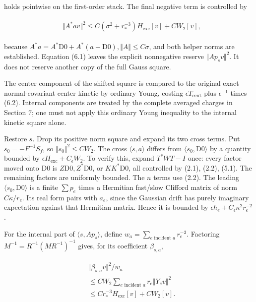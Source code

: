 holds pointwise on the first-order stack. The final negative term is
controlled by

\begin{gather*}
\begin{aligned}
& \Vert A^{*}a v\Vert ^{2}\le C( \sigma ^{2}+r_{*}^{-3})H_{\mathrm{exc}}[v]+CW_{2}[v],
\end{aligned}\tag{6.2}
\end{gather*}

because
\(A^{*}a=A^{*}\mathrm{D0}+A^{*}(a-\mathrm{D0}), \Vert A\Vert \le C \sigma\),
and both helper norms are established. Equation (6.1) leaves the
explicit nonnegative reserve \(\Vert A p_{s} v\Vert ^{2}\). It does not
reserve another copy of the full Gauss square.

The center component of the shifted square is compared to the original
exact normal-covariant center kinetic by ordinary Young, costing
\(\epsilon  T_{\mathrm{cent}}\) plus \(\epsilon ^{-1}\) times (6.2).
Internal components are treated by the complete averaged charges in
Section \(7\); one must not apply this ordinary Young inequality to the
internal kinetic square alone.

Restore \(s\). Drop its positive norm square and expand its two cross
terms. Put \(s_{0}=-F^{-1}S_{f}\), so
\(\Vert s_{0}\Vert ^{2}\le CW_{2}\). The cross \(\langle s,a\rangle\)
differs from \(\langle s_{0},\mathrm{D0}\rangle\) by a quantity bounded
by \(\epsilon  H_{\mathrm{exc}}+C_{\epsilon} W_{2}\). To verify this,
expand \(T^{*}WT-I\) once: every factor moved onto \(\mathrm{D0}\) is
\(Z\mathrm{D0}, Z^{*}\mathrm{D0}\), or \(KK^{*}\mathrm{D0}\), all
controlled by (2.1), (2.2), (5.1). The remaining factors are uniformly
bounded. The \(n\) terms use (2.2). The leading
\(\langle s_{0},\mathrm{D0}\rangle\) is a finite \(\sum  p_{e}\) times a
Hermitian fast/slow Clifford matrix of norm \(C \kappa  /r_{e}\). Its
real form pairs with \(a_{e}\), since the Gaussian drift has purely
imaginary expectation against that Hermitian matrix. Hence it is bounded
by \(\epsilon  h_{e}+C_{\epsilon} \kappa ^{2}r_{e}^{-2}\).

For the internal part of \(\langle s,A p_{s}\rangle\), define
\(w_{a}= \sum _{e \text{ incident } a}r_{e}^{-3}\). Factoring
\(M^{-1}=R^{-1}(MR^{-1})^{-1}\) gives, for its coefficient
\(\beta _{s,a}\),

\begin{gather*}
\begin{aligned}
& \Vert  \beta _{s,a} v\Vert ^{2}/w_{a} \\
& \le CW_{2} \sum _{e \text{ incident } a}r_{e}\Vert Y_{e} v\Vert ^{2} \\
& \le C r_{*}^{-3}H_{\mathrm{exc}}[v]+CW_{2}[v].
\end{aligned}\tag{6.3}
\end{gather*}

